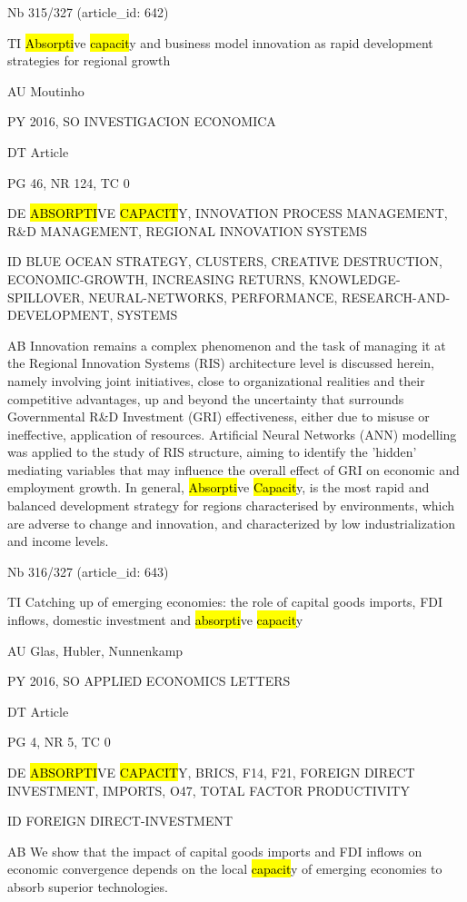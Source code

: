 \documentclass[a4paper]{article}
\begin{document}
\vspace*{-2cm}
Nb \tabto{0cm}315/327 (article\_id: 642)\par
TI \tabto{0cm}\hl{Absorpti}ve \hl{capacit}y and business model innovation as rapid development strategies for regional growth\par
AU \tabto{0cm}Moutinho\par
PY \tabto{0cm}2016, SO INVESTIGACION ECONOMICA\par
DT \tabto{0cm}Article\par
PG \tabto{0cm}46, NR 124, TC 0\par
DE \tabto{0cm}\hl{ABSORPTI}VE \hl{CAPACIT}Y, INNOVATION PROCESS MANAGEMENT, R\&D MANAGEMENT, REGIONAL INNOVATION SYSTEMS\par
ID \tabto{0cm}BLUE OCEAN STRATEGY, CLUSTERS, CREATIVE DESTRUCTION, ECONOMIC-GROWTH, INCREASING RETURNS, KNOWLEDGE-SPILLOVER, NEURAL-NETWORKS, PERFORMANCE, RESEARCH-AND-DEVELOPMENT, SYSTEMS\par
AB \tabto{0cm}Innovation remains a complex phenomenon and the task of managing it at the Regional Innovation Systems (RIS) architecture level is discussed herein, namely involving joint initiatives, close to organizational realities and their competitive advantages, up and beyond the uncertainty that surrounds Governmental R\&D Investment (GRI) effectiveness, either due to misuse or ineffective, application of resources. Artificial Neural Networks (ANN) modelling was applied to the study of RIS structure, aiming to identify the 'hidden' mediating variables that may influence the overall effect of GRI on economic and employment growth. In general, \hl{Absorpti}ve \hl{Capacit}y, is the most rapid and balanced development strategy for regions characterised by environments, which are adverse to change and innovation, and characterized by low industrialization and income levels.\par
\clearpage

\vspace*{-2cm}
Nb \tabto{0cm}316/327 (article\_id: 643)\par
TI \tabto{0cm}Catching up of emerging economies: the role of capital goods imports, FDI inflows, domestic investment and \hl{absorpti}ve \hl{capacit}y\par
AU \tabto{0cm}Glas, Hubler, Nunnenkamp\par
PY \tabto{0cm}2016, SO APPLIED ECONOMICS LETTERS\par
DT \tabto{0cm}Article\par
PG \tabto{0cm}4, NR 5, TC 0\par
DE \tabto{0cm}\hl{ABSORPTI}VE \hl{CAPACIT}Y, BRICS, F14, F21, FOREIGN DIRECT INVESTMENT, IMPORTS, O47, TOTAL FACTOR PRODUCTIVITY\par
ID \tabto{0cm}FOREIGN DIRECT-INVESTMENT\par
AB \tabto{0cm}We show that the impact of capital goods imports and FDI inflows on economic convergence depends on the local \hl{capacit}y of emerging economies to absorb superior technologies.\par
\clearpage
\end{document}
